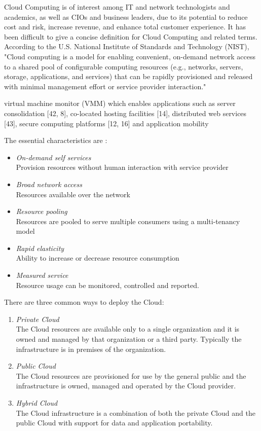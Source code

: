\documentclass[12pt,a4paper]{report}
\begin{document}
Cloud Computing is of interest among IT and network technologists
and academics, as well as CIOs and business leaders, due to its potential to 
reduce cost and risk, increase revenue, and enhance total customer experience.\cite{weinman2011future}
It has been difficult to give a concise definition for Cloud Computing 
and related terms. According to the U.S. National Institute of Standards 
and Technology (NIST), \cite{mell2009nist}  "Cloud computing is a model for enabling convenient,
on-demand network access to a shared pool of configurable computing resources
(e.g., networks, servers, storage, applications, and services) that can 
be rapidly provisioned and released with minimal management 
effort or service provider interaction." 

virtual machine monitor (VMM) which enables applications such as server consolidation [42, 8], co-located hosting
facilities [14], distributed web services [43], secure computing platforms [12, 16] and application
mobility

The essential characteristics are \cite{mell2009nist} :

\begin{itemize}
  \item \emph{On-demand self services} \\ Provision resources without human
     interaction with service provider
  \item \emph{Broad network access} \\Resources available over the network
  \item \emph{Resource pooling} \\ Resources are pooled to serve multiple 
        consumers using a multi-tenancy model
  \item \emph{Rapid elasticity} \\Ability to increase or decrease resource consumption
  \item \emph{Measured service} \\Resource usage can be monitored, controlled and reported.
\end{itemize}

There are three common ways to deploy the Cloud:

\begin{enumerate}
 \item \emph{Private Cloud} \\The Cloud resources are available only 
to a single organization and it is owned and managed by 
that organization or a third party. Typically the infrastructure is in premises of the 
organization.
 \item \emph{Public Cloud} \\The Cloud resources are provisioned for use by the general 
public and the infrastructure is owned, managed and operated by the Cloud provider.
  \item \emph{Hybrid Cloud} \\The Cloud infrastructure is a combination of 
both the private Cloud and the public Cloud with support for data and application 
portability.
\end{enumerate}
\end{document}
